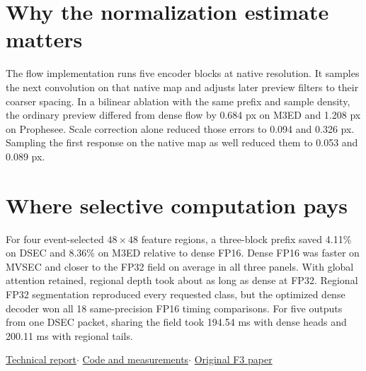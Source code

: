 \documentclass[11pt,letterpaper]{article}
\begin{document}
\section*{Why the normalization estimate matters}
The flow implementation runs five encoder blocks at native resolution. It samples the next convolution on that native map and adjusts later preview filters to their coarser spacing. In a bilinear ablation with the same prefix and sample density, the ordinary preview differed from dense flow by 0.684 px on M3ED and 1.208 px on Prophesee. Scale correction alone reduced those errors to 0.094 and 0.326 px. Sampling the first response on the native map as well reduced them to 0.053 and 0.089 px.

\section*{Where selective computation pays}
For four event-selected $48\times48$ feature regions, a three-block prefix saved 4.11\% on DSEC and 8.36\% on M3ED relative to dense FP16. Dense FP16 was faster on MVSEC and closer to the FP32 field on average in all three panels. With global attention retained, regional depth took about as long as dense at FP32. Regional FP32 segmentation reproduced every requested class, but the optimized dense decoder won all 18 same-precision FP16 timing comparisons. For five outputs from one DSEC packet, sharing the field took 194.54 ms with dense heads and 200.11 ms with regional tails.

\vfill
{\small\color{muted}
\href{https://github.com/RobertAris/f3-regional-inference/blob/main/paper/technical.pdf}{Technical report}\enspace$\cdot$\enspace
\href{https://github.com/RobertAris/f3-regional-inference}{Code and measurements}\enspace$\cdot$\enspace
\href{https://doi.org/10.1126/scirobotics.aec8218}{Original F3 paper}}
\end{document}
